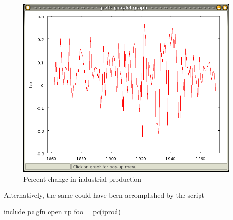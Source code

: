 \begin{figure}[htbp]
  \centering
  \includegraphics[scale=0.5]{figures/iprod_pc}
  \caption{Percent change in industrial production}
  \label{fig:iprod_pc}
\end{figure}

Alternatively, the same could have been accomplished by the script
\begin{code}
include pc.gfn
open np
foo = pc(iprod)
\end{code}


